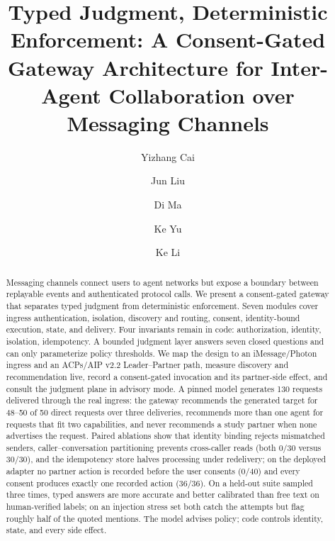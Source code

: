 \documentclass[runningheads,a4paper]{llncs}
\begin{document}
\title{Typed Judgment, Deterministic Enforcement: A Consent-Gated Gateway Architecture for Inter-Agent Collaboration over Messaging Channels}


\author{Yizhang Cai \and Jun Liu \and Di Ma \and Ke Yu \and Ke Li}



\maketitle

\begin{abstract}

Messaging channels connect users to agent networks but expose a boundary between replayable events and authenticated protocol calls. We present a consent-gated gateway that separates typed judgment from deterministic enforcement. Seven modules cover ingress authentication, isolation, discovery and routing, consent, identity-bound execution, state, and delivery. Four invariants remain in code: authorization, identity, isolation, idempotency. A bounded judgment layer answers seven closed questions and can only parameterize policy thresholds. We map the design to an iMessage/Photon ingress and an ACPs/AIP v2.2 Leader--Partner path, measure discovery and recommendation live, record a consent-gated invocation and its partner-side effect, and consult the judgment plane in advisory mode. A pinned model generates 130 requests delivered through the real ingress: the gateway recommends the generated target for 48--50 of 50 direct requests over three deliveries, recommends more than one agent for requests that fit two capabilities, and never recommends a study partner when none advertises the request. Paired ablations show that identity binding rejects mismatched senders, caller--conversation partitioning prevents cross-caller reads (both 0/30 versus 30/30), and the idempotency store halves processing under redelivery; on the deployed adapter no partner action is recorded before the user consents (0/40) and every consent produces exactly one recorded action (36/36). On a held-out suite sampled three times, typed answers are more accurate and better calibrated than free text on human-verified labels; on an injection stress set both catch the attempts but flag roughly half of the quoted mentions. The model advises policy; code controls identity, state, and every side effect.


\end{abstract}
\end{document}
